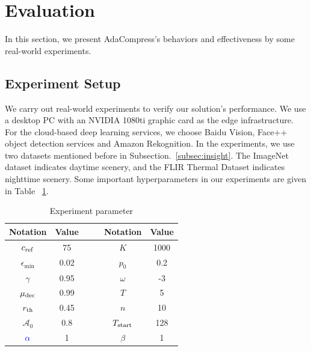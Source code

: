 \section{Evaluation}
\label{Section: evaluation}

In this section, we present AdaCompress's behaviors and effectiveness by some real-world experiments. %

\subsection{Experiment Setup}

We carry out real-world experiments to verify our solution's performance. We use a desktop PC with an NVIDIA 1080ti graphic card as the edge infrastructure. For the cloud-based deep learning services, we choose Baidu Vision, Face++ object detection services and Amazon Rekognition. In the experiments, we use two datasets mentioned before in Subsection.~\ref{subsec:insight}. The ImageNet dataset indicates daytime scenery, and the FLIR Thermal Dataset indicates nighttime scenery. Some important hyperparameters in our experiments are given in Table ~\ref{tab: parameters}.

\begin{table}[!t]
	\centering
	\caption{Experiment parameter}
	\label{tab: parameters}
	\begin{tabular}{cccccc}
		\toprule
		Notation          & Value & & & Notation     & Value  \\ \midrule
		$c_{\rm ref}$ & 75    & & & $K$      & 1000   \\
		$\epsilon_{\min}$    & 0.02  & & & $p_0$    & 0.2    \\
		$\gamma$      & 0.95  & & & $\omega$ & -3   \\
		$ \mu_{\rm dec} $ & 0.99 & & & $ T $ & 5  \\
		$r_{\rm th}$  & 0.45   & & &   $ n  $  &  10      \\ 
		{\color{revise} $ \mathcal{A}_0 $} & {\color{revise}0.8} & & & {\color{revise}$ T_{\rm start} $} & {\color{revise}128} \\
		$ {\color{revise}\alpha} $ & {\color{revise}1} & & & {\color{revise}$ \beta $} & {\color{revise}1}  \\ \bottomrule
	\end{tabular}
\end{table}

